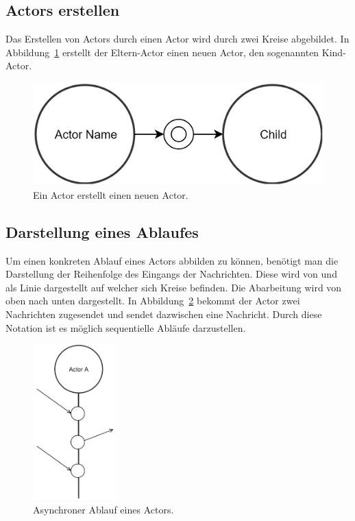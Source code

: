 \subsection{Actors erstellen}
Das Erstellen von Actors durch einen Actor wird durch zwei Kreise abgebildet. In Abbildung~\ref{fig:actor:diagram:childActorCreation} erstellt der Eltern-Actor einen neuen Actor, den sogenannten Kind-Actor.
\begin{figure}
  \centering
  \includegraphics[width=.7\linewidth]{gfx/actor/childActorCreation}
  \caption{Ein Actor erstellt einen neuen Actor.}
  \label{fig:actor:diagram:childActorCreation}
\end{figure}

\subsection{Darstellung eines Ablaufes}
Um einen konkreten Ablauf eines Actors abbilden zu können, benötigt man die Darstellung der  Reihenfolge des Eingangs der Nachrichten. Diese wird von \cite{kuhn2017reactive} und \cite{Vernon2015ReactiveAkka} als Linie dargestellt auf welcher sich Kreise befinden. Die Abarbeitung wird von oben nach unten dargestellt. In Abbildung~\ref{fig:actor:diagram:asynchronMessageReceivment} bekommt der Actor zwei Nachrichten zugesendet und sendet dazwischen eine Nachricht. Durch diese Notation ist es möglich sequentielle Abläufe darzustellen.
\begin{figure}
  \centering
  \includegraphics[height=6cm]{gfx/actor/actorAsynchMessgeFlow}
  \caption{Asynchroner Ablauf eines Actors.}
  \label{fig:actor:diagram:asynchronMessageReceivment}
\end{figure}